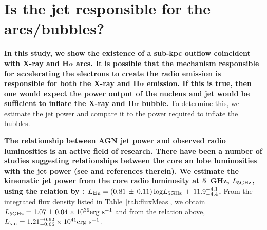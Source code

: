 \documentclass[fleqn,usenatbib]{mnras}
\def\tab{Table}
\begin{document}
\section{Is the jet responsible for the arcs/bubbles?}
\label{sec:jet_pwr}

\textbf{In this study, we show the existence of a sub-kpc outflow coincident with X-ray and H$\alpha$ arcs. It is possible that the mechanism responsible for accelerating the electrons to create the radio emission is responsible for both the X-ray and H$\alpha$ emission. If this is true, then one would expect the power output of the nucleus and jet would be sufficient to inflate the X-ray and H$\alpha$ bubble. }To determine this, we estimate the jet power and compare it to the power required to inflate the bubbles.

\textbf{The relationship between AGN jet power and observed radio luminosities is an active field of 
research. There have been a number of studies suggesting relationships between the core an lobe 
luminosities with the jet power (see \citealt{MH07,BF2011,GS2016} and references therein). We 
estimate the kinematic jet power from the core radio luminosity at 5~GHz, $L_{5 \rm GHz}$, using the 
relation by \cite{MH07}: $L_{\rm kin} = (0.81\,\pm\,0.11)\,{\rm log}L_{5 \rm GHz}\, +\, 
11.9^{+4.1}_{-4.4}$.} From the integrated flux density listed in \tab~\ref{tab:fluxMeas}, we obtain 
$L_{5 \rm GHz} = 1.07 \pm 0.04 \times 10^{36} {\rm erg~s^{-1}}$ and from the relation above, $L_{\rm 
kin} = 1.21^{+0.62}_{-0.66} \times 10^{41} {\rm erg~s^{-1}}$. 
\end{document}

